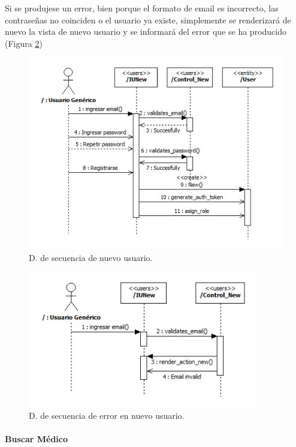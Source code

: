					Si se produjese un error, bien porque el formato de email es incorrecto, las contraseñas no coinciden o el usuario ya existe, simplemente se renderizará de nuevo la vista de nuevo usuario y se informará del error que se ha producido (Figura \ref{fig:cont_user_new_error})
					
					\begin{figure}[H]
					  \centering
					    \includegraphics[width=13cm]{img/jpg/secuencia/21_user_new.jpg}
					  \caption{D. de secuencia de nuevo usuario.}
					  \label{fig:cont_user_new}
					\end{figure}

					\begin{figure}[H]
					  \centering
					    \includegraphics[width=10cm]{img/jpg/secuencia/22_user_new_error.jpg}
					  \caption{D. de secuencia de error en nuevo usuario.}
					  \label{fig:cont_user_new_error}
					\end{figure}
				\newpage
				\paragraph{Buscar Médico} %
				\label{subp:cont_buscar_medico}
					
